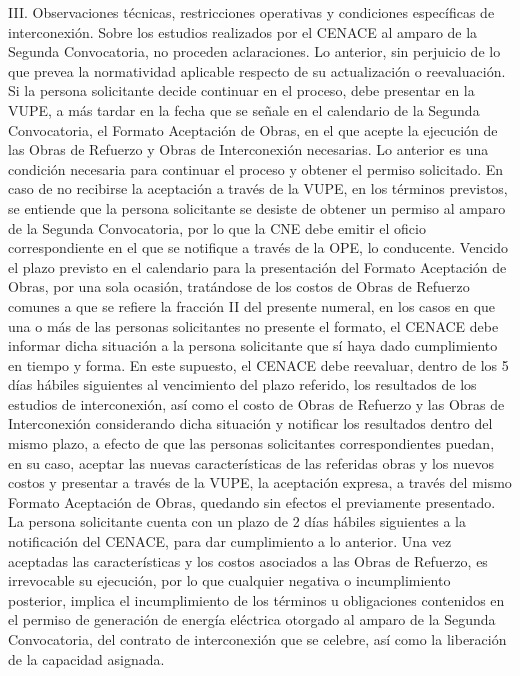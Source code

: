III. Observaciones técnicas, restricciones operativas y condiciones específicas de interconexión.
Sobre los estudios realizados por el CENACE al amparo de la Segunda Convocatoria, no proceden aclaraciones. Lo anterior, sin perjuicio de lo que prevea la normatividad aplicable respecto de su actualización o reevaluación.
Si la persona solicitante decide continuar en el proceso, debe presentar en la VUPE, a más tardar en la fecha que se señale en el calendario de la Segunda Convocatoria, el Formato Aceptación de Obras, en el que acepte la ejecución de las Obras de Refuerzo y Obras de Interconexión necesarias. Lo anterior es una condición necesaria para continuar el proceso y obtener el permiso solicitado.
En caso de no recibirse la aceptación a través de la VUPE, en los términos previstos, se entiende que la persona solicitante se desiste de obtener un permiso al amparo de la Segunda Convocatoria, por lo que la CNE debe emitir el oficio correspondiente en el que se notifique a través de la OPE, lo conducente.
Vencido el plazo previsto en el calendario para la presentación del Formato Aceptación de Obras, por una sola ocasión, tratándose de los costos de Obras de Refuerzo comunes a que se refiere la fracción II del presente numeral, en los casos en que una o más de las personas solicitantes no presente el formato, el CENACE debe informar dicha situación a la persona solicitante que sí haya dado cumplimiento en tiempo y forma. En este supuesto, el CENACE debe reevaluar, dentro de los 5 días hábiles siguientes al vencimiento del plazo referido, los resultados de los estudios de interconexión, así como el costo de Obras de Refuerzo y las Obras de Interconexión considerando dicha situación y notificar los resultados dentro del mismo plazo, a efecto de que las personas solicitantes correspondientes puedan, en su caso, aceptar las nuevas características de las referidas obras y los nuevos costos y presentar a través de la VUPE, la aceptación expresa, a través del mismo Formato Aceptación de Obras, quedando sin efectos el previamente presentado. La persona solicitante cuenta con un plazo de 2 días hábiles siguientes a la notificación del CENACE, para dar cumplimiento a lo anterior.
Una vez aceptadas las características y los costos asociados a las Obras de Refuerzo, es irrevocable su ejecución, por lo que cualquier negativa o incumplimiento posterior, implica el incumplimiento de los términos u obligaciones contenidos en el permiso de generación de energía eléctrica otorgado al amparo de la Segunda Convocatoria, del contrato de interconexión que se celebre, así como la liberación de la capacidad asignada.
